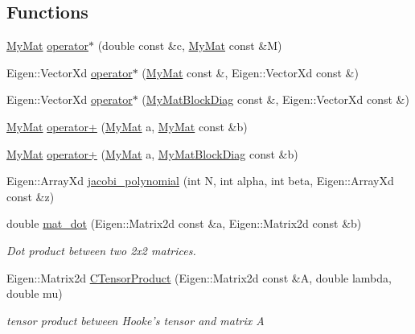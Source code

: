 \subsection*{Functions}
\begin{DoxyCompactItemize}
\item 
\hyperlink{classTspeed_1_1MyMat}{My\-Mat} \hyperlink{namespaceTspeed_ae052fa580f4cab9151f68a690e8d5bca}{operator$\ast$} (double const \&c, \hyperlink{classTspeed_1_1MyMat}{My\-Mat} const \&M)
\item 
Eigen\-::\-Vector\-Xd \hyperlink{namespaceTspeed_a47058bd8c3ef387978ab2b5c81038632}{operator$\ast$} (\hyperlink{classTspeed_1_1MyMat}{My\-Mat} const \&, Eigen\-::\-Vector\-Xd const \&)
\item 
Eigen\-::\-Vector\-Xd \hyperlink{namespaceTspeed_a709169815b0e02183d3c4d5b581e735f}{operator$\ast$} (\hyperlink{classTspeed_1_1MyMatBlockDiag}{My\-Mat\-Block\-Diag} const \&, Eigen\-::\-Vector\-Xd const \&)
\item 
\hyperlink{classTspeed_1_1MyMat}{My\-Mat} \hyperlink{namespaceTspeed_ab8df12f3c804c527b4d9006350d50c62}{operator+} (\hyperlink{classTspeed_1_1MyMat}{My\-Mat} a, \hyperlink{classTspeed_1_1MyMat}{My\-Mat} const \&b)
\item 
\hyperlink{classTspeed_1_1MyMat}{My\-Mat} \hyperlink{namespaceTspeed_a1f4d38ebd3223a0e5ea8cfad29fcc10c}{operator+} (\hyperlink{classTspeed_1_1MyMat}{My\-Mat} a, \hyperlink{classTspeed_1_1MyMatBlockDiag}{My\-Mat\-Block\-Diag} const \&b)
\item 
Eigen\-::\-Array\-Xd \hyperlink{namespaceTspeed_a9ba8173dee16becd9ff4f59553c2d042}{jacobi\-\_\-polynomial} (int N, int alpha, int beta, Eigen\-::\-Array\-Xd const \&z)
\item 
double \hyperlink{namespaceTspeed_a6a29478b3e21b48d3017dab2e3b10291}{mat\-\_\-dot} (Eigen\-::\-Matrix2d const \&a, Eigen\-::\-Matrix2d const \&b)
\begin{DoxyCompactList}\small\item\em Dot product between two 2x2 matrices. \end{DoxyCompactList}\item 
Eigen\-::\-Matrix2d \hyperlink{namespaceTspeed_a9d11c91c5dfc1a66b18914535aaf57b3}{C\-Tensor\-Product} (Eigen\-::\-Matrix2d const \&A, double lambda, double mu)
\begin{DoxyCompactList}\small\item\em tensor product between Hooke's tensor and matrix A \end{DoxyCompactList}\item 

\end{DoxyCompactItemize}
